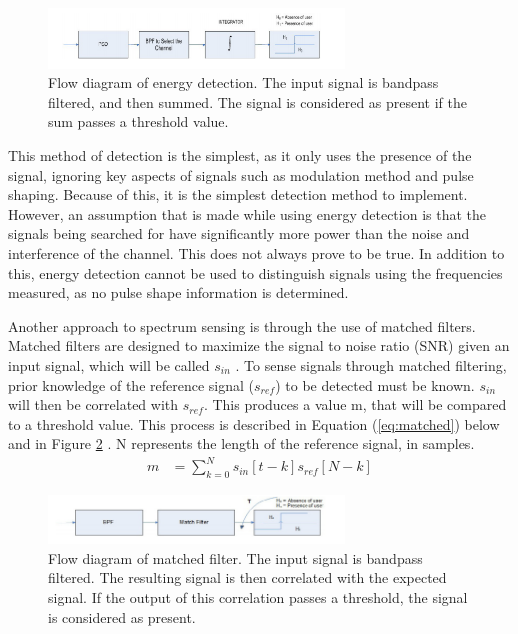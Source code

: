 \begin{figure}[ht]
\centering
\includegraphics[width=0.70\textwidth]{img/energy_detection.png}
\caption{Flow diagram of energy detection. The input signal is bandpass filtered, and then summed. The signal is considered as present if the sum passes a threshold value.}
\label{fig:energy_detection}
\end{figure}\par

This method of detection is the simplest, as it only uses the presence of the signal, ignoring key aspects of signals such as modulation method and pulse shaping. Because of this, it is the simplest detection method to implement. However, an assumption that is made while using energy detection is that the signals being searched for have significantly more power than the noise and interference of the channel. This does not always prove to be true. In addition to this, energy detection cannot be used to distinguish signals using the frequencies measured, as no pulse shape information is determined.\par
Another approach to spectrum sensing is through the use of matched filters. Matched filters are designed to maximize the signal to noise ratio (SNR) given an input signal, which will be called $s_{in}$ \cite{sensing_energy}. To sense signals through matched filtering, prior knowledge of the reference signal ($s_{ref}$) to be detected must be known. $s_{in}$ will then be correlated with $s_{ref}$. This produces a value m, that will be compared to a threshold value. This process is described in Equation (\ref{eq:matched}) below and in Figure \ref{figure:matched_filter}
. N represents the length of the reference signal, in samples. 
\begin{align} \label{eq:matched}
    m &= \sum_{k = 0}^{N}s_{in}[t-k]s_{ref}[N-k] 
\end{align}
\begin{figure}[ht]
\centering
\includegraphics[width=0.70\textwidth]{img/match_filter.png}
\caption{Flow diagram of matched filter. The input signal is bandpass filtered. The resulting signal is then correlated with the expected signal. If the output of this correlation passes a threshold, the signal is considered as present.}
\label{figure:matched_filter}
\end{figure}\par
